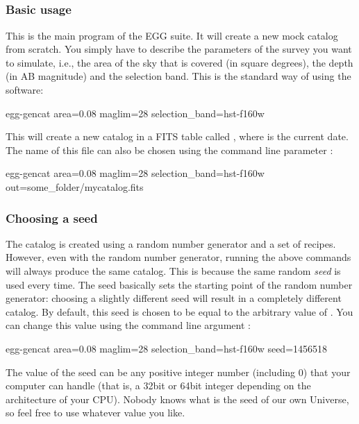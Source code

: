 \documentclass[12pt,a4paper]{article}
\newcommand{\egg}{\textsc{EGG}\xspace}
\begin{document}
\subsection{}

\subsubsection{Basic usage}
This is the main program of the \egg suite. It will create a new mock catalog from scratch. You simply have to describe the parameters of the survey you want to simulate, i.e., the area of the sky that is covered (in square degrees), the depth (in AB magnitude) and the selection band. This is the standard way of using the software:
\begin{bashcode}
egg-gencat area=0.08 maglim=28 selection_band=hst-f160w
\end{bashcode}
This will create a new catalog in a FITS table called , where \bashinline{[yyyymmdd]} is the current date. The name of this file can also be chosen using the command line parameter :
\begin{bashcode}
egg-gencat area=0.08 maglim=28 selection_band=hst-f160w out=some_folder/mycatalog.fits
\end{bashcode}

\subsubsection{Choosing a seed}
The catalog is created using a random number generator and a set of recipes. However, even with the random number generator, running the above commands will always produce the same catalog. This is because the same random \emph{seed} is used every time. The seed basically sets the starting point of the random number generator: choosing a slightly different seed will result in a completely different catalog. By default, this seed is chosen to be equal to the arbitrary value of . You can change this value using the command line argument :
\begin{bashcode}
egg-gencat area=0.08 maglim=28 selection_band=hst-f160w seed=1456518
\end{bashcode}
The value of the seed can be any positive integer number (including 0) that your computer can handle (that is, a 32bit or 64bit integer depending on the architecture of your CPU). Nobody knows what is the seed of our own Universe, so feel free to use whatever value you like.
\end{document}
